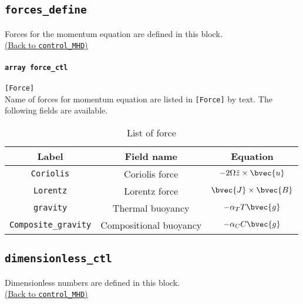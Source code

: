 \subsection{\tt forces\_define}
\label{href_t:forces_define}
Forces for the momentum equation are defined in this block. \\
\hyperref[href_i:forces_define]{(Back to {\tt control\_MHD})}

\paragraph{\tt array force\_ctl}
\label{href_t:force_ctl}
\verb|[Force]| \\
Name of forces for momentum equation are listed in \verb|[Force]| by text.
The following fields are available.
%
\begin{table}[htp]
\caption{List of force}
\begin{center}
\begin{tabular}{|c|c|c|}
\hline
 Label & Field name & Equation \\ \hline
\verb|Coriolis| & Coriolis force & $-2\Omega \hat{z} \times \bvec{u} $ \\
\verb|Lorentz| & Lorentz force &  $\bvec{J} \times \bvec{B} $ \\
\verb|gravity| & Thermal buoyancy & $-\alpha_{T} T \bvec{g}$ \\
\verb|Composite_gravity| & Compositional buoyancy  & $-\alpha_{C} C \bvec{g}$\\ \hline
\end{tabular}
\end{center}
\label{table:forces}
\end{table}
%

\subsection{\tt dimensionless\_ctl}
\label{href_t:dimensionless_ctl}
Dimensionless numbers are defined in this block. \\
\hyperref[href_i:dimensionless_ctl]{(Back to {\tt control\_MHD})}

